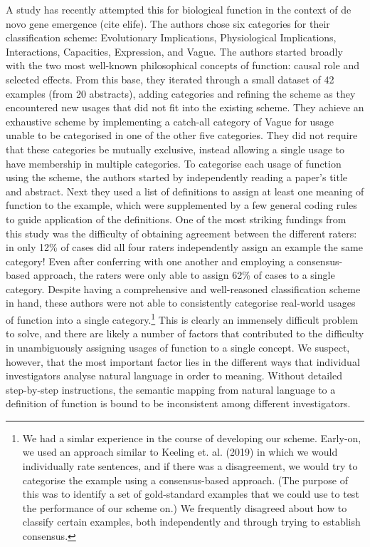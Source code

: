 \documentclass{article}
\begin{document}
A study has recently attempted this for biological function in the context of de novo gene emergence (cite elife).
The authors chose six categories for their classification scheme: Evolutionary Implications, Physiological Implications, Interactions, Capacities, Expression, and Vague.
The authors started broadly with the two most well-known philosophical concepts of function: causal role and selected effects.
From this base, they iterated through a small dataset of 42 examples (from 20 abstracts), adding categories and refining the scheme as they encountered new usages that did not fit into the existing scheme.
They achieve an exhaustive scheme by implementing a catch-all category of Vague for usage unable to be categorised in one of the other five categories.
They did not require that these categories be mutually exclusive, instead allowing a single usage to have membership in multiple categories.
To categorise each usage of function using the scheme, the authors started by independently reading a paper's title and abstract.
Next they used a list of definitions to assign at least one meaning of function to the example, which were supplemented by a few general coding rules to guide application of the definitions.
One of the most striking fundings from this study was the difficulty of obtaining agreement between the different raters: in only 12\% of cases did all four raters independently assign an example the same category!
Even after conferring with one another and employing a consensus-based approach, the raters were only able to assign 62\% of cases to a single category.
Despite having a comprehensive and well-reasoned classification scheme in hand, these authors were not able to consistently categorise real-world usages of function into a single category.\footnote{We had a simlar experience in the course of developing our scheme. Early-on, we used an approach similar to Keeling et. al. (2019) in which we would individually rate sentences, and if there was a disagreement, we would try to categorise the example using a consensus-based approach. (The purpose of this was to identify a set of gold-standard examples that we could use to test the performance of our scheme on.) We frequently disagreed about how to classify certain examples, both independently and through trying to establish consensus.}
This is clearly an immensely difficult problem to solve, and there are likely a number of factors that contributed to the difficulty in unambiguously assigning usages of function to a single concept.
We suspect, however, that the most important factor lies in the different ways that individual investigators analyse natural language in order to meaning.
Without detailed step-by-step instructions, the semantic mapping from natural language to a definition of function is bound to be inconsistent among different investigators.
\end{document}
